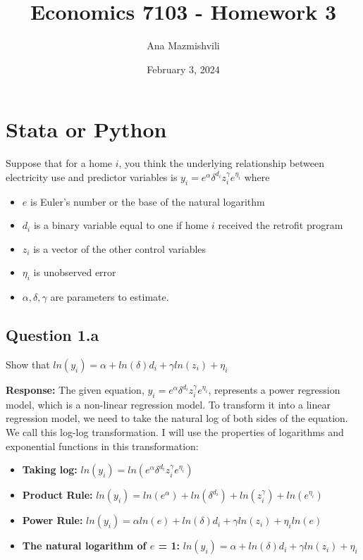 \documentclass{article}
\title{Economics 7103 - Homework 3}
\author{Ana Mazmishvili}
\date{ February 3, 2024 }
\begin{document}
  
\maketitle 
\section{Stata or Python}
Suppose that for a home \(i\), you think the underlying relationship between electricity use and predictor
variables is \(y_i= e^{\alpha} \delta^{d_i} z_i^\gamma e^{\eta_i}\) where 
\begin{itemize}
    \item \(e\) is Euler’s number or the base of the natural logarithm 
    \item \(d_i\) is a binary variable equal to one if home \(i\) received the retrofit program
    \item \(z_i\) is a vector of the other control variables
    \item \(\eta_i\) is unobserved error 
    \item \({\alpha, \delta, \gamma}\) are parameters to estimate.
\end{itemize}

\subsection*{Question 1.a} 
Show that \(ln(y_i)= \alpha + ln(\delta)d_i + \gamma ln(z_i) + \eta_i\)

\textbf{Response:} 
The given equation, \(y_i= e^{\alpha} \delta^{d_i} z_i^\gamma e^{\eta_i}\), represents a power regression model, which is a non-linear regression model. To transform it into a linear regression model, we need to take the natural log of both sides of the equation. We call this log-log transformation. I will use the properties of logarithms and exponential functions in this transformation:
\begin{itemize}
    \item \textbf{Taking log:} \(ln(y_i)= ln(e^{\alpha} \delta^{d_i} z_i^\gamma e^{\eta_i})\)
    \item \textbf{Product Rule:} \(ln(y_i)= ln(e^{\alpha})+ln(\delta^{d_i}) + ln(z_i^\gamma)+ln(e^{\eta_i})\)
    \item \textbf{Power Rule:} \(ln(y_i)= \alpha ln(e)+ln(\delta)d_i + \gamma ln(z_i) +\eta_iln(e)\)
    \item \textbf{The natural logarithm of \(e\) = 1:} \(ln(y_i)= \alpha + ln(\delta)d_i + \gamma ln(z_i) + \eta_i\)      
\end{itemize}
\end{document}
